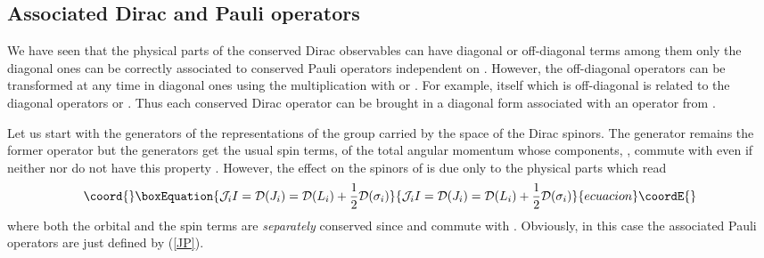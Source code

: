 \documentclass[a4paper,12pt]{article}
\begin{document}
\subsection{Associated Dirac and Pauli operators}

We have seen that the physical parts of the conserved Dirac observables 
can have diagonal or off-diagonal terms among them only the diagonal 
ones can be correctly associated to  conserved Pauli operators independent 
on \coordHE{}.  However, the off-diagonal operators can be transformed at any 
time in diagonal ones using the multiplication with \coordHE{} or \coordHE{}. 
For example,  \coordHE{} itself which is off-diagonal is related to the diagonal 
operators \coordHE{} or  \coordHE{}. Thus each conserved Dirac 
operator can be brought in a diagonal form  associated with an operator 
from \coordHE{}. 

Let us start with the generators of the representations of the group 
\coordHE{} carried by the space of the Dirac spinors. The \coordHE{} 
generator remains the former  operator \coordHE{} but the \coordHE{} generators 
get  the usual spin terms, 
\coordHE{} of the total 
angular momentum whose components, \coordHE{}, 
commute with \coordHE{} even if neither \coordHE{} nor \coordHE{} do not have this 
property \cite{CV2,CV4}. However, the effect on the spinors of \myHighlight{$\Eh$}\coordHE{} 
is due only to the physical parts which read 
\begin{equation}\coord{}\boxEquation{\label{JI}
{\cal J}_{i}I= {\cal D}(J_{i})={\cal D}(L_{i}) + \frac{1}{2}
{\cal D}(\sigma_{i})
}{{\cal J}_{i}I= {\cal D}(J_{i})={\cal D}(L_{i}) + \frac{1}{2}
{\cal D}(\sigma_{i})
}{ecuacion}\coordE{}\end{equation}
where both the orbital and the spin terms are {\em separately} conserved 
since \coordHE{} and \coordHE{} commute with \myHighlight{$\Delta$}\coordHE{}. Obviously, in this 
case the associated Pauli operators are just \coordHE{} defined by (\ref{JP}). 
\end{document}
